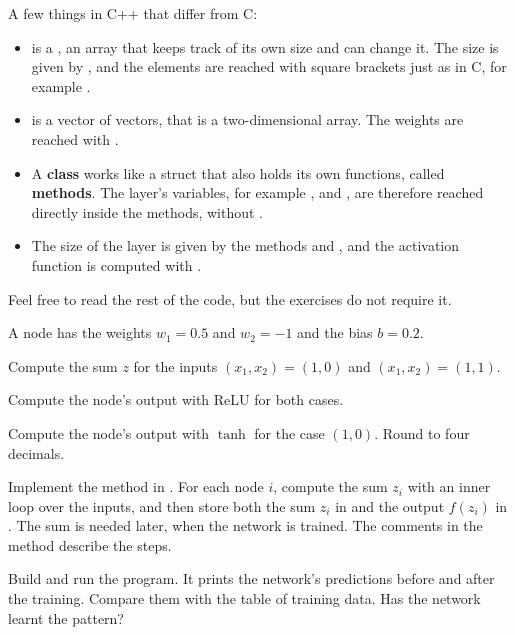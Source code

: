 A few things in C++ that differ from C:
\begin{itemize}
  \item {} is a , an array that keeps track of its own
    size and can change it. The size is given by , and the elements are reached
    with square brackets just as in C, for example .
  \item {} is a vector of vectors, that is a two-dimensional array. The weights
    are reached with .
  \item A \textbf{class} works like a struct that also holds its own functions, called
    \textbf{methods}. The layer's variables, for example ,  and
    , are therefore reached directly inside the methods, without .
  \item The size of the layer is given by the methods  and
    , and the activation function is computed with
    .
\end{itemize}
Feel free to read the rest of the code, but the exercises do not require it.

A node has the weights $w_1 = 0.5$ and $w_2 = -1$ and the bias $b = 0.2$.
\begin{parts}
  \item Compute the sum $z$ for the inputs $(x_1, x_2) = (1, 0)$ and $(x_1, x_2) = (1, 1)$.
  \item Compute the node's output with ReLU for both cases.
  \item Compute the node's output with $\tanh$ for the case $(1, 0)$. Round to four decimals.
\end{parts}

\begin{parts}
  \item Implement the method  in . For each node $i$, compute
    the sum $z_i$ with an inner loop over the inputs, and then store both the sum $z_i$ in
     and the output $f(z_i)$ in . The sum is needed
    later, when the network is trained. The comments in the method describe the steps.
  \item Build and run the program. It prints the network's predictions before and after the
    training. Compare them with the table of training data. Has the network learnt the pattern?
\end{parts}

